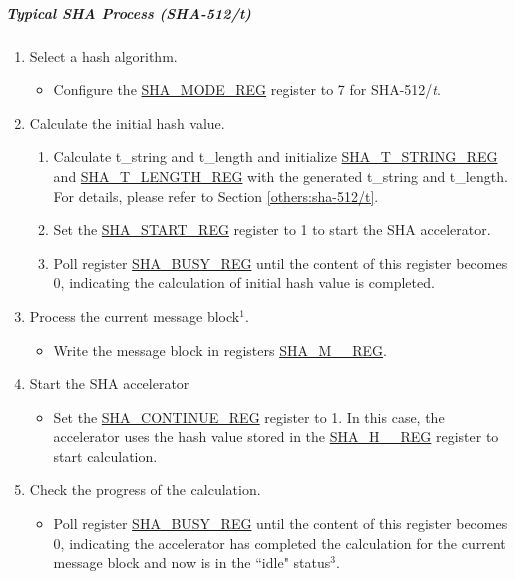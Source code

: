 \documentclass[main\_\_EN.tex]{subfiles}
\begin{document}
\subparagraph{Typical SHA Process (SHA-512/{\it{t}})}

\begin{enumerate}
    \item \label{others:sha-sel-algorithm2} Select a hash algorithm.
    \begin{itemize}
        \item Configure the \hyperref[regdesc:SHAMODEREG]{SHA\_MODE\_REG} register to 7 for SHA-512/{\it{t}}.
    \end{itemize}
    \item Calculate the initial hash value.
        \begin{enumerate}
            \item Calculate t\_string and t\_length and initialize \hyperref[regdesc:SHATSTRINGREG]{SHA\_T\_STRING\_REG} and  \hyperref[regdesc:SHATLENGTHREG]{SHA\_T\_LENGTH\_REG} with the generated t\_string and t\_length. For details, please refer to Section \ref{others:sha-512/t}.
            \item Set the \hyperref[regdesc:SHASTARTREG]{SHA\_START\_REG} register to 1 to start the SHA accelerator.
            \item Poll register \hyperref[regdesc:SHABUSYREG]{SHA\_BUSY\_REG} until the content of this register becomes 0, indicating the calculation of initial hash value is completed.
        \end{enumerate}

    \item \label{others:sha-current-block1} Process the current message block\hyperref[others:sha-note-typical-sha]{$^1$}.
    \begin{itemize}
        \item Write the message block in registers \hyperref[regdesc:SHAMNREG]{SHA\_M\_\_REG}.
    \end{itemize}
    \item Start the SHA accelerator
    \begin{itemize}
        \item Set the \hyperref[regdesc:SHACONTINUEREG]{SHA\_CONTINUE\_REG} register to 1. In this case, the accelerator uses the hash value stored in the \hyperref[regdesc:SHAHNREG]{SHA\_H\_\_REG} register to start calculation.
    \end{itemize}

    \item Check the progress of the calculation.
    \begin{itemize}
        \item Poll register \hyperref[regdesc:SHABUSYREG]{SHA\_BUSY\_REG} until the content of this register becomes 0, indicating the accelerator has completed the calculation for the current message block and now is in the ``idle" status\hyperref[others:sha-note-typical-sha]{$^3$}.
    \end{itemize}


\end{enumerate}
\end{document}
